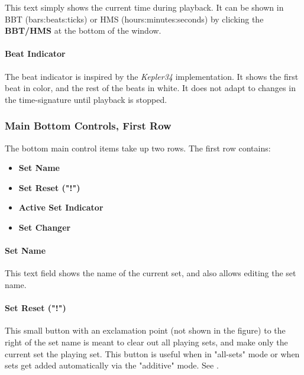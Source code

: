 \documentclass[
 11pt,
 twoside,
 a4paper,
 final                                 %
]{article}
\begin{document}
   This text simply shows the current time during playback. 
   It can be shown in BBT (bars:beats:ticks) or HMS (hours:minutes:seconds)
   by clicking the \textbf{BBT/HMS} at the bottom of the window.

\paragraph{Beat Indicator}
\label{paragraph:introduction_beat_indicator}

   The beat indicator is inspired by the \textsl{Kepler34} implementation.
   It shows the first beat in color, and the rest of the beats in white.
   It does not adapt to changes in the time-signature until
   playback is stopped.

\subsubsection{Main Bottom Controls, First Row}
\label{subsubsec:introduction_main_bottom_controls}

   The bottom main control items take up two rows.  The first row contains:

   \begin{itemize}
      \item \textbf{Set Name}
      \item \textbf{Set Reset ("!")}
      \item \textbf{Active Set Indicator}
      \item \textbf{Set Changer}
   \end{itemize}

\paragraph{Set Name}
\label{paragraph:introduction_set_name}

   This text field shows the name of the current set, and also allows editing
   the set name.

\paragraph{Set Reset ("!")}
\label{paragraph:introduction_set_reset}

   This small button with an exclamation point
   (not shown in the figure) to the right of the set name is meant to clear
   out all playing sets, and make only the current set the playing set.
   This button is useful when in "all-sets" mode or when sets get added
   automatically via the "additive" mode.
   See .
\end{document}
